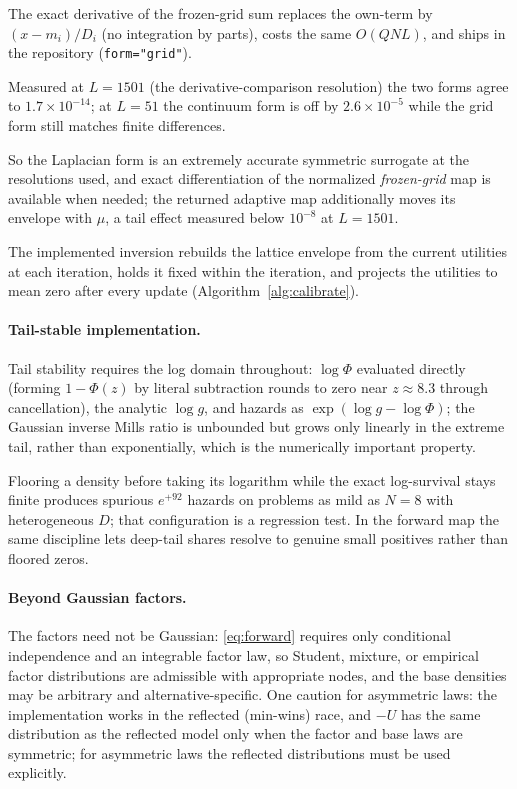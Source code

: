 \documentclass[12pt]{article}
\theoremstyle{remark}
\begin{document}
The exact derivative
of the frozen-grid sum replaces the own-term by $(x - m_i)/D_i$ (no
integration by parts), costs the same $O(QNL)$, and ships in the repository
(\texttt{form="grid"}).

Measured at $L = 1501$ (the derivative-comparison resolution) the
two forms agree to $1.7\times10^{-14}$; at $L = 51$ the continuum form is
off by $2.6\times10^{-5}$ while the grid form still matches finite
differences.

So the Laplacian form is an extremely accurate symmetric surrogate at the
resolutions used, and exact differentiation of the normalized
\emph{frozen-grid} map is available when needed; the returned adaptive map
additionally moves its envelope with $\mu$, a tail effect measured below
$10^{-8}$ at $L = 1501$.

The implemented inversion rebuilds the lattice envelope from the current
utilities at each iteration, holds it fixed within the iteration, and
projects the utilities to mean zero after every update
(Algorithm~\ref{alg:calibrate}).

\paragraph{Tail-stable implementation.} Tail stability requires the log
domain throughout: $\log \Phi$ evaluated directly (forming $1 - \Phi(z)$
by literal subtraction rounds to zero near $z \approx 8.3$ through
cancellation), the analytic $\log g$, and hazards as $\exp(\log g - \log
\Phi)$; the Gaussian inverse Mills ratio is unbounded but grows only
linearly in the extreme tail, rather than exponentially, which is the
numerically important property.

Flooring a density before taking its logarithm while the exact
log-survival stays finite produces spurious $e^{+92}$ hazards on problems as
mild as $N = 8$ with heterogeneous $D$; that configuration is a regression
test. In the forward map the same discipline lets deep-tail shares resolve to
genuine small positives rather than floored zeros.

\paragraph{Beyond Gaussian factors.} The factors need not be Gaussian: \eqref{eq:forward} requires only
conditional independence and an integrable factor law, so Student, mixture,
or empirical factor distributions are admissible with appropriate nodes, and
the base densities may be arbitrary and alternative-specific. One caution for
asymmetric laws: the implementation works in the reflected (min-wins)
race, and $-U$ has the same distribution as the reflected model only when the
factor and base laws are symmetric; for asymmetric laws the reflected
distributions must be used explicitly.
\end{document}
